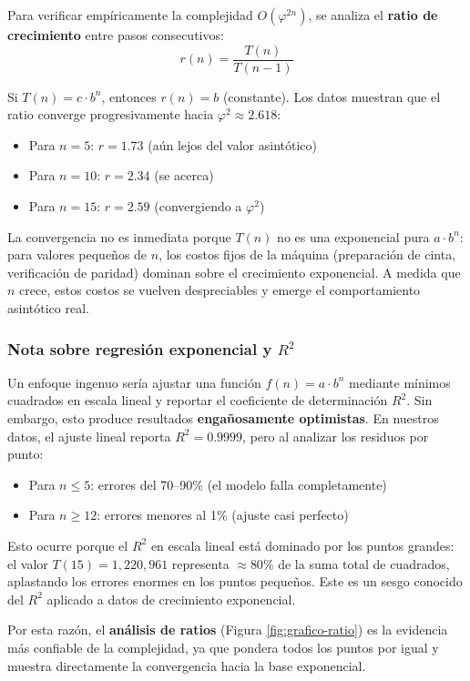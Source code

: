 \documentclass[12pt,a4paper]{article}
\begin{document}
Para verificar empíricamente la complejidad $O(\varphi^{2n})$, se analiza el \textbf{ratio de crecimiento} entre pasos consecutivos:
$$r(n) = \frac{T(n)}{T(n-1)}$$

Si $T(n) = c \cdot b^n$, entonces $r(n) = b$ (constante). Los datos muestran que el ratio converge progresivamente hacia $\varphi^2 \approx 2.618$:

\begin{itemize}
    \item Para $n = 5$: $r = 1.73$ (aún lejos del valor asintótico)
    \item Para $n = 10$: $r = 2.34$ (se acerca)
    \item Para $n = 15$: $r = 2.59$ (convergiendo a $\varphi^2$)
\end{itemize}

La convergencia no es inmediata porque $T(n)$ no es una exponencial pura $a \cdot b^n$: para valores pequeños de $n$, los costos fijos de la máquina (preparación de cinta, verificación de paridad) dominan sobre el crecimiento exponencial. A medida que $n$ crece, estos costos se vuelven despreciables y emerge el comportamiento asintótico real.

\subsubsection{Nota sobre regresión exponencial y $R^2$}

Un enfoque ingenuo sería ajustar una función $f(n) = a \cdot b^n$ mediante mínimos cuadrados en escala lineal y reportar el coeficiente de determinación $R^2$. Sin embargo, esto produce resultados \textbf{engañosamente optimistas}. En nuestros datos, el ajuste lineal reporta $R^2 = 0.9999$, pero al analizar los residuos por punto:

\begin{itemize}
    \item Para $n \leq 5$: errores del 70--90\% (el modelo falla completamente)
    \item Para $n \geq 12$: errores menores al 1\% (ajuste casi perfecto)
\end{itemize}

Esto ocurre porque el $R^2$ en escala lineal está dominado por los puntos grandes: el valor $T(15) = 1{,}220{,}961$ representa $\approx 80\%$ de la suma total de cuadrados, aplastando los errores enormes en los puntos pequeños. Este es un sesgo conocido del $R^2$ aplicado a datos de crecimiento exponencial.

Por esta razón, el \textbf{análisis de ratios} (Figura \ref{fig:grafico-ratio}) es la evidencia más confiable de la complejidad, ya que pondera todos los puntos por igual y muestra directamente la convergencia hacia la base exponencial.
\end{document}
